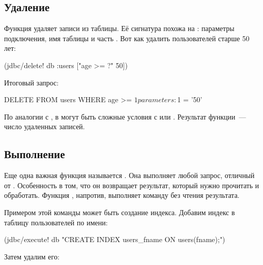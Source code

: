 \subsection{Удаление}


Функция  удаляет записи из таблицы. Её сигнатура похожа на : параметры подключения, имя таблицы и часть . Вот как удалить пользователей старше 50 лет:

\begin{english}
  \begin{clojure}
(jdbc/delete! db :users ["age >= ?" 50])
  \end{clojure}
\end{english}

Итоговый запрос:

\begin{english}
  \begin{sql}
DELETE FROM users WHERE age >= $1
parameters: $1 = '50'
  \end{sql}
\end{english}

По аналогии с , в  могут быть сложные условия с  или . Результат функции~--- число удаленных записей.

\subsection{Выполнение}


Еще одна важная функция называется . Она выполняет любой запрос, отличный от . Особенность  в том, что он возвращает результат, который нужно прочитать и обработать. Функция , напротив, выполняет команду без чтения результата.


Примером этой команды может быть создание индекса. Добавим индекс в таблицу пользователей по имени:

\begin{english}
  \begin{clojure}
(jdbc/execute! db
  "CREATE INDEX users_fname ON users(fname);")
  \end{clojure}
\end{english}

Затем удалим его:

